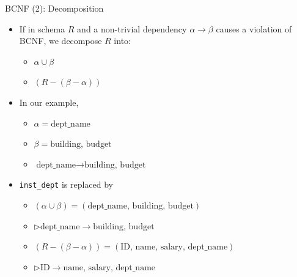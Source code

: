\documentclass[aspectratio=169, xcolor=dvipsnames]{beamer}
\begin{document}
\begin{frame}{BCNF (2): Decomposition}
    \begin{itemize}[<+->]
        \item If in schema $R$ and a non-trivial dependency $\alpha \rightarrow \beta$ causes a violation of BCNF, we decompose $R$ into:
        \begin{itemize}
            \item[$\triangleright$] $\alpha \cup \beta$
            \item[$\triangleright$] $(R - (\beta - \alpha))$
        \end{itemize}
        \item In our example,
        \begin{itemize}
            \item[$\triangleright$] $\alpha = \text{dept\_name}$
            \item[$\triangleright$] $\beta = \text{building, budget}$
            \item[$\triangleright$] $\text{dept\_name} \rightarrow \text{building, budget}$
        \end{itemize}
        \item \texttt{inst\_dept} is replaced by
        \begin{itemize}
            \item[$\triangleright$] $(\alpha \cup \beta) = (\text{dept\_name, building, budget})$
            \item[$\triangleright$] $\triangleright \text{dept\_name} \rightarrow \text{building, budget}$
            \item[$\triangleright$] $(R - (\beta - \alpha)) = (\text{ID, name, salary, dept\_name})$
            \item[$\triangleright$] $\triangleright \text{ID} \rightarrow \text{name, salary, dept\_name}$
        \end{itemize}
    \end{itemize}
\end{frame}
\end{document}
